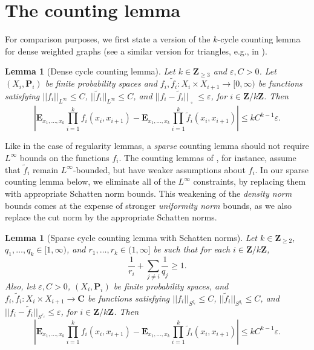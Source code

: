 \documentclass[reqno,11pt]{amsart}
\newtheorem{lemma}[theorem]{Lemma}
\newtheorem{knownlemma}{Lemma}
\theoremstyle{definition}
\theoremstyle{remark}
\numberwithin{equation}{section}
\newcommand{\Z}{\mathbf{Z}}
\newcommand{\C}{\mathbf{C}}
\renewcommand{\P}{\mathbf{P}}
\newcommand{\E}{\mathbf{E}}
\newcommand{\eps}{\varepsilon}
\renewcommand{\tilde}{\widetilde}
\newcommand{\sq}{_{\substack{ \\ \square}}}
\begin{document}
\section{The counting lemma} \label{sec:counting}

For comparison purposes, we first state a version of the $k$-cycle counting lemma for dense weighted graphs (see a similar version for triangles, e.g., in \cite[Lemma 3.4]{conlon2021regularity}).

\begin{knownlemma}[Dense cycle counting lemma]
Let $k \in \Z_{\ge 3}$ and $\eps, C > 0$. Let $(X_i, \P_i)$ be finite probability spaces and $f_i, \tilde{f}_i : X_i \times X_{i+1} \to [0, \infty)$ be functions satisfying $||f_i||_{L^\infty} \le C$, $||\tilde{f}_i||_{L^\infty} \le C$, and $||f_i - \tilde{f}_i||\sq \le \eps$, for $i \in \Z/k\Z$. Then
\[
    \left\vert \E_{x_1, \ldots, x_k} \prod_{i=1}^k f_{i}(x_i,x_{i+1})
    -
    \E_{x_1, \ldots, x_k} \prod_{i=1}^k \tilde{f}_{i}(x_i,x_{i+1}) 
    \right\vert
    \le k C^{k-1}
    \eps.
\]
\end{knownlemma}

Like in the case of regularity lemmas, a \emph{sparse} counting lemma should not require $L^\infty$ bounds on the functions $f_i$. The counting lemmas of \cite{conlon2014green,conlon2021regularity,conlon2021graphs}, for instance, assume that $\tilde{f}_i$ remain $L^\infty$-bounded, but have weaker assumptions about $f_i$. In our sparse counting lemma below, we eliminate all of the $L^\infty$ constraints, by replacing them with appropriate Schatten norm bounds. This weakening of the \emph{density norm} bounds comes at the expense of stronger \emph{uniformity norm} bounds, as we also replace the cut norm by the appropriate Schatten norms.

\begin{lemma}[Sparse cycle counting lemma with Schatten norms] \label{lem:counting}
Let $k \in \Z_{\ge 2}$, $q_1, \ldots, q_k \in [1, \infty)$, and $r_1, \ldots, r_k \in (1, \infty]$ be such that for each $i \in \Z/k\Z$,
\[
    \frac{1}{r_i} + \sum_{j \neq i} \frac{1}{q_j} \ge 1.
\]
Also, let $\eps, C > 0$, $(X_i, \P_i)$ be finite probability spaces, and $f_{i}, \tilde{f}_{i} : X_i \times X_{i+1} \to \C$ be functions satisfying $||f_{i}||_{S^{q_i}} \le C$, $||\tilde{f}_{i}||_{S^{q_i}} \le C$, and $||f_{i} - \tilde{f}_{i}||_{S^{r_i}} \le \eps$, for $i \in \Z/k\Z$. Then
\[
    \left\vert \E_{x_1, \ldots, x_k} \prod_{i=1}^k f_{i}(x_i,x_{i+1})
    -
    \E_{x_1, \ldots, x_k} \prod_{i=1}^k \tilde{f}_{i}(x_i,x_{i+1}) 
    \right\vert
    \le k C^{k-1}
    \eps.
\]
\end{lemma}
\end{document}
